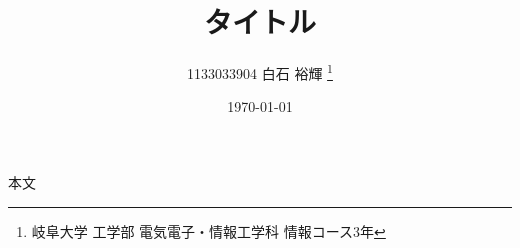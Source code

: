 \documentclass[10pt, a4j]{jsarticle}
\title{タイトル}
\author{
	1133033904 白石 裕輝
	\thanks{岐阜大学 工学部 電気電子・情報工学科 情報コース3年}
}
\date{\today}
\begin{document}
%
\maketitle
%
本文
%
%
\end{document}
